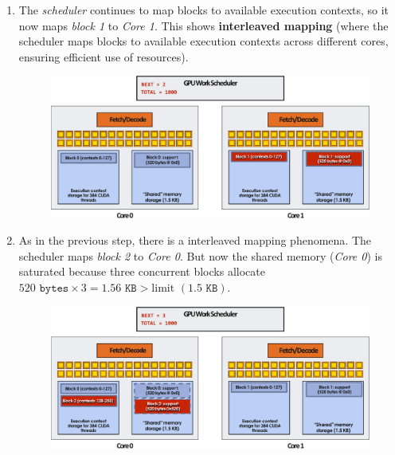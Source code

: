 \begin{enumerate}
    \newpage

    \item The \emph{scheduler} continues to map blocks to available execution contexts, so it now maps \emph{block 1} to \emph{Core 1}. This shows \textbf{interleaved mapping} (where the scheduler maps blocks to available execution contexts across different cores, ensuring efficient use of resources).
    \begin{figure}[!htp]
        \centering
        \includegraphics[width=\textwidth]{img/cuda-convolve-kernel-3.pdf}
    \end{figure}


    \item As in the previous step, there is a interleaved mapping phenomena. The scheduler maps \emph{block 2} to \emph{Core 0}. But now the shared memory (\emph{Core 0}) is saturated because three concurrent blocks allocate $520 \texttt{ bytes} \times 3 = 1.56 \texttt{ KB} > \text{limit } (1.5 \texttt{ KB})$.
    \begin{figure}[!htp]
        \centering
        \includegraphics[width=\textwidth]{img/cuda-convolve-kernel-4.pdf}
    \end{figure}

    \newpage


\end{enumerate}
